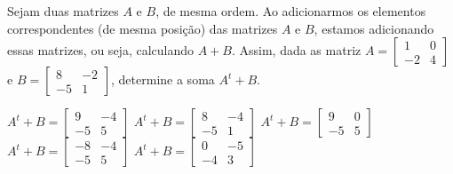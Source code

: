 Sejam duas matrizes $A$ e $B$, de mesma ordem. Ao adicionarmos os elementos correspondentes (de mesma posição) das matrizes $A$ e $B$, estamos adicionando essas matrizes, ou seja, calculando $A+B$. Assim, dada as matriz $A = \left[ \begin{array}{cc}
1 & 0 \\
-2 & 4
\end{array} \right]$ e $B = \left[ \begin{array}{cc}
8 & -2 \\
-5 & 1
\end{array} \right]$, determine a soma $A^t+B$.

$A^t+B = \left[ \begin{array}{cc} 9 & -4 \\ -5 & 5 \end{array} \right]$
$A^t+B = \left[ \begin{array}{cc} 8 & -4 \\ -5 & 1 \end{array} \right]$
$A^t+B = \left[ \begin{array}{cc} 9 & 0  \\ -5 & 5 \end{array} \right]$
$A^t+B = \left[ \begin{array}{cc}-8 & -4 \\ -5 & 5 \end{array} \right]$
$A^t+B = \left[ \begin{array}{cc} 0 & -5 \\ -4 & 3 \end{array} \right]$


